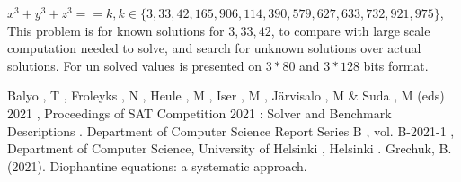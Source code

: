\documentclass[conference]{IEEEtran}
\begin{document}
    $x^3 + y^3 + z^3 == k, k \in \{3, 33, 42, 165, 906, 114, 390, 579, 627, 633, 732, 921, 975\}$, This problem is for known solutions for $3, 33, 42$, to compare with large scale computation needed to solve, and search for unknown solutions over actual solutions. For un solved values is presented on $3 * 80$ and $3 * 128$ bits format.

    \begin{thebibliography}{00}
         Balyo , T , Froleyks , N , Heule , M , Iser , M , Järvisalo , M & Suda , M (eds) 2021 , Proceedings of SAT Competition 2021 : Solver and Benchmark Descriptions . Department of Computer Science Report Series B , vol. B-2021-1 , Department of Computer Science, University of Helsinki , Helsinki .
         Grechuk, B. (2021). Diophantine equations: a systematic approach.
    \end{thebibliography}
    \vspace{12pt}
\end{document}
